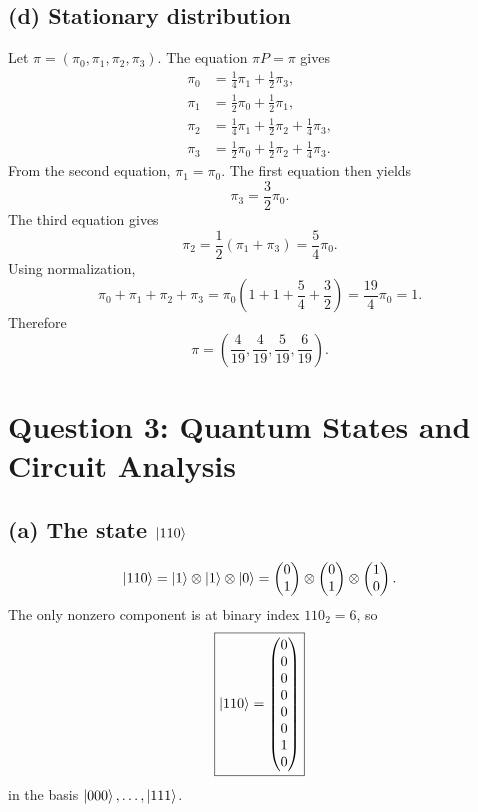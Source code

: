 \documentclass[11pt,a4paper]{article}
\begin{document}
\subsection*{(d) Stationary distribution}
Let $\pi=(\pi_0,\pi_1,\pi_2,\pi_3)$. The equation $\pi P=\pi$ gives
\begin{align*}
\pi_0&=\frac14\pi_1+\frac12\pi_3,\\
\pi_1&=\frac12\pi_0+\frac12\pi_1,\\
\pi_2&=\frac14\pi_1+\frac12\pi_2+\frac14\pi_3,\\
\pi_3&=\frac12\pi_0+\frac12\pi_2+\frac14\pi_3.
\end{align*}
From the second equation, $\pi_1=\pi_0$. The first equation then yields
\[
\pi_3=\frac32\pi_0.
\]
The third equation gives
\[
\pi_2=\frac12(\pi_1+\pi_3)=\frac54\pi_0.
\]
Using normalization,
\[
\pi_0+\pi_1+\pi_2+\pi_3
=\pi_0\left(1+1+\frac54+\frac32\right)
=\frac{19}{4}\pi_0=1.
\]
Therefore
\[
\boxed{\pi=\left(\frac4{19},\frac4{19},\frac5{19},\frac6{19}\right)}.
\]

\newpage
\section*{Question 3: Quantum States and Circuit Analysis}

\subsection*{(a) The state $\ket{110}$}
\[
\ket{110}=\ket1\otimes\ket1\otimes\ket0
=
\begin{pmatrix}0\\1\end{pmatrix}
\otimes
\begin{pmatrix}0\\1\end{pmatrix}
\otimes
\begin{pmatrix}1\\0\end{pmatrix}.
\]
The only nonzero component is at binary index $110_2=6$, so
\[
\boxed{
\ket{110}=
\begin{pmatrix}
0\\0\\0\\0\\0\\0\\1\\0
\end{pmatrix}}
\]
in the basis $\ket{000},\ldots,\ket{111}$.
\end{document}

